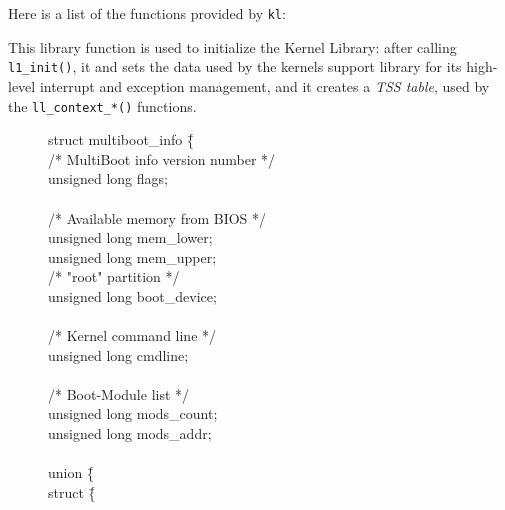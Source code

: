 \documentclass[a4paper]{report}
\begin{document}
Here is a list of the functions provided by {\tt kl}:


This library function is used to initialize the Kernel Library: after
calling {\tt l1\_init()}, it and sets the data used by the kernels support
library for its high-level interrupt and exception management, and it
creates a {\em TSS table}, used by the {\tt ll\_context\_*()} functions.

\begin{figure}
\begin{tt}
\begin{tabbing}
struct multiboot\_info \= \{                                            \\
/* MultiBoot info version number */                                     \\
\>      unsigned long flags;                                            \\
									\\
/* Available memory from BIOS */                                        \\
\>      unsigned long mem\_lower;                                       \\
\>      unsigned long mem\_upper;                                       \\
/* "root" partition */                                                  \\
\>      unsigned long boot\_device;                                     \\
									\\
/* Kernel command line */                                               \\
\>      unsigned long cmdline;                                          \\
									\\
/* Boot-Module list */                                                  \\
\>      unsigned long mods\_count;                                      \\
\>      unsigned long mods\_addr;                                       \\
									\\
\>      union \= \{                                                     \\
\>      \>      struct \= \{                                            \\

\end{tabbing}
\end{tt}
\end{figure}
\end{document}

